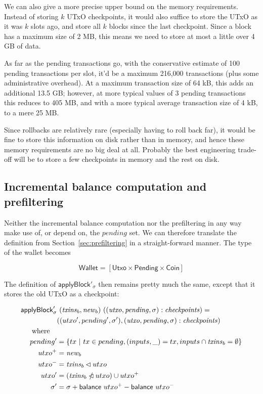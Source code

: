 \documentclass{article}
\newcommand{\restrictdom}{\lhd}
\newcommand{\subtractdom}{\mathbin{\slashed{\restrictdom}}}
\begin{document}
We can also give a more precise upper bound on the memory requirements. Instead
of storing $k$ UTxO checkpoints, it would also suffice to store the UTxO as it
was $k$ slots ago, and store all $k$ blocks since the last checkpoint. Since a
block has a maximum size of 2 MB, this means we need to store at most a little
over 4 GB of data.

As far as the pending transactions go, with the conservative estimate of 100
pending transactions per slot, it'd be a maximum 216,000 transactions (plus some
administrative overhead). At a maximum transaction size of 64 kB, this adds an
additional 13.5 GB; however, at more typical values of 3 pending transactions
this reduces to 405 MB, and with a more typical average transaction size of 4
kB, to a mere 25 MB.

Since rollbacks are relatively rare (especially having to roll back far), it
would be fine to store this information on disk rather than in memory, and hence
these memory requirements are no big deal at all. Probably the best engineering
trade-off will be to store a few checkpoints in memory and the rest on disk.

\subsection{Incremental balance computation and prefiltering}

Neither the incremental balance computation nor the prefiltering in any way make
use of, or depend on, the $\mathit{pending}$ set. We can therefore translate the
definition from Section~\ref{sec:prefiltering} in a straight-forward manner. The
type of the wallet becomes

\begin{equation*}
\mathsf{Wallet} = [\mathsf{Utxo} \times \mathsf{Pending} \times \mathsf{Coin}]
\end{equation*}

The definition of $\mathsf{applyBlock}'_\sigma$ then remains pretty much the
same, except that it stores the old UTxO as a checkpoint:

\begin{equation*}
\begin{split}
\mathsf{applyBlock}'_\sigma & ~ (\mathit{txins}_b, \mathit{new}_b) ~ ((\mathit{utxo}, \mathit{pending}, \sigma) : \mathit{checkpoints}) = \\
& ((utxo^\prime, pending^\prime, \sigma^\prime), (\mathit{utxo}, \mathit{pending}, \sigma) : \mathit{checkpoints}) \\
\text{where} \quad \\
    pending^\prime & = \{ tx ~|~ tx \in pending, (inputs, \_) = tx, inputs \cap \mathit{txins}_b = \emptyset \} \\
    utxo^+ & = \mathit{new}_b \\
    utxo^- & = \mathit{txins}_b \restrictdom utxo \\
    utxo^\prime & = (\mathit{txins}_b \subtractdom utxo) \cup utxo^+ \\
    \sigma^\prime & = \sigma + \mathsf{balance} ~ utxo^+ - \mathsf{balance} ~ utxo^- \\
\end{split}
\end{equation*}
\end{document}
